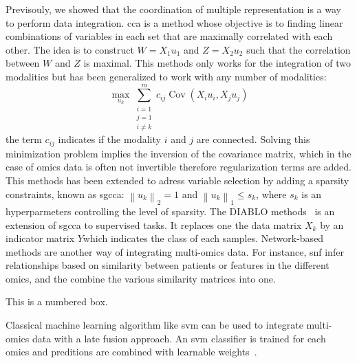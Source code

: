 \documentclass[../main.tex]{subfiles}
\begin{document}
		Previsouly, we showed that the coordination of multiple representation is a way to perform data integration.
		\Gls{cca} is a method whose objective is to finding linear combinations of variables in each set that are maximally correlated with each other.
		The idea is to construct \(W=X_1u_1\) and \(Z=X_2u_2\) such that the correlation between \(W\) and \(Z\) is maximal.
		This methods only works for the integration of two modalities but has been generalized to work with any number of modalities:
		\begin{equation}
			\max_{u_k} \sum_{\substack{i=1 \\ j=1 \\ i\neq k}}^{m} c_{ij}\operatorname{Cov}\left(X_iu_i,X_ju_j\right)
		\end{equation}
		the term \(c_{ij}\) indicates if the modality \(i\) and \(j\) are connected.
		Solving this minimization problem implies the inversion of the covariance matrix, which in the case of omics data is often not invertible therefore regularization terms are added.
		This methods has been extended to adress variable selection by adding a sparsity constraints, known as \gls{sgcca}: \({\left\|u_k \right\|}_2 = 1\) and \({\left\|u_k \right\|}_1 \leq s_k\), where \(s_k\) is an hyperparmeters controlling the level of sparsity.
		The DIABLO methods~\cite{DIABLO} is an extension of \gls{sgcca} to supervised tasks.
		It replaces one the data matrix \(X_k\) by an indicator matrix \(Y\)which indicates the class of each samples.
		Network-based methods are another way of integrating multi-omics data.
		For instance, \gls{snf} infer relationships based on similarity between patients or features in the different omics, and the combine the various similarity matrices into one.

		\begin{mybox}[label=box:snf]{}
			This is a numbered box.
		\end{mybox}

		Classical machine learning algorithm like \gls{svm} can be used to integrate multi-omics data with a late fusion approach.
		An \gls{svm} classifier is trained for each omics and preditions are combined with learnable weights~\cite{CarrilloPerez2022}.
\end{document}
